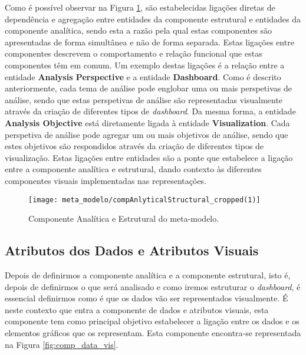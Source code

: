 Como é possível observar na Figura \ref{fig:comp_anal_struct}, são estabelecidas ligações diretas de dependência e agregação entre entidades da componente estrutural e entidades da componente analítica, sendo esta a razão pela qual estas componentes são apresentadas de forma simultânea e não de forma separada. Estas ligações entre componentes descrevem o comportamento e relação funcional que estas componentes têm em comum. Um exemplo destas ligações é a relação entre a entidade \textbf{Analysis Perspective} e a entidade \textbf{Dashboard}. Como é descrito anteriormente, cada tema de análise pode englobar uma ou mais perspetivas de análise, sendo que estas perspetivas de análise são representadas visualmente através da criação de diferentes tipos de \textit{dashboard}. Da mesma forma, a entidade \textbf{Analysis Objective} está diretamente ligada à entidade \textbf{Visualization}. Cada perspetiva de análise pode agregar um ou mais objetivos de análise, sendo que estes objetivos são respondidos através da criação de diferentes tipos de visualização. Estas ligações entre entidades são a ponte que estabelece a ligação entre a componente analítica e estrutural, dando contexto às diferentes componentes visuais implementadas nas representações.

\begin{figure}[htbp]
  \texttt{[image: meta\_modelo/compAnlyticalStructural\_cropped(1)]}
  \centering
  \caption{Componente Analítica e Estrutural do meta-modelo.}
  \label{fig:comp_anal_struct}
\end{figure}

\subsection{Atributos dos Dados e Atributos Visuais} %
\label{sub:data_vis_attr}

Depois de definirmos a componente analítica e a componente estrutural, isto é, depois de definirmos o que será analisado e como iremos estruturar o \textit{dashboard}, é essencial definirmos como é que os dados vão ser representados visualmente. É neste contexto que entra a componente de dados e atributos visuais, esta componente tem como principal objetivo estabelecer a ligação entre os dados e os elementos gráficos que os representam. Esta componente encontra-se representada na Figura \ref{fig:comp_data_vis}.

